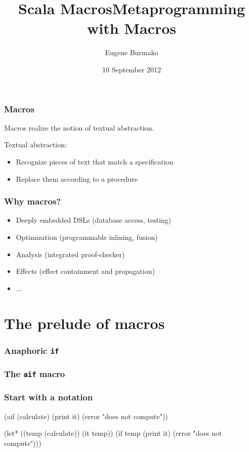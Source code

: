 \documentclass[hyperref={bookmarks=false}]{beamer}
\title{Scala Macros}
\begin{document}
\title{Metaprogramming with Macros}
\author{Eugene Burmako}
\date{10 September 2012}
{
\begin{frame}
  \titlepage
\end{frame}
}

\begin{frame}[fragile]
\frametitle{Macros}
\pause
Macros realize the notion of textual abstraction.

Textual abstraction:
\begin{itemize}
\item Recognize pieces of text that match a specification
\item Replace them according to a procedure
\end{itemize}
\end{frame}

\begin{frame}[fragile]
\frametitle{Why macros?}
\begin{itemize}
\item Deeply embedded DSLs (database access, testing)
\item Optimization (programmable inlining, fusion)
\item Analysis (integrated proof-checker)
\item Effects (effect containment and propagation)
\item ...
\end{itemize}
\end{frame}



\section{The prelude of macros}

\begin{frame}[fragile]
\frametitle<1>{Anaphoric \texttt{if}}
\frametitle<2>{The \texttt{aif} macro}
\frametitle<3->{Start with a notation}
\begin{semiverbatim}
(aif (calculate)
  (print it)
  (error "does not compute"))


(let* ((temp (calculate))
       (it temp))
  (if temp
    (print it)
    (error "does not compute")))
\end{semiverbatim}
\end{frame}
\end{document}
